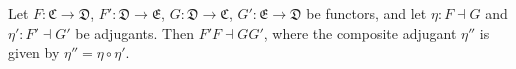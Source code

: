 Let $F: \mathfrak{C} \to \mathfrak{D}$, $F': \mathfrak{D} \to \mathfrak{E}$, $G: \mathfrak{D} \to \mathfrak{C}$, $G': \mathfrak{E} \to \mathfrak{D}$ be functors, and let $\eta: F \dashv G$ and $\eta': F' \dashv G'$ be adjugants. Then $F'F \dashv GG'$, where the composite adjugant $\eta''$ is given by $\eta'' = \eta \circ \eta'$.
